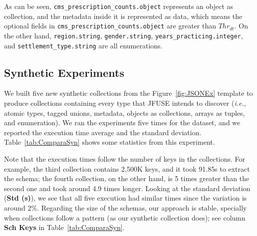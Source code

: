 As can be seen, \texttt{cms\_prescription\_counts.object} represents an object as collection, and the metadata inside it is represented as data, which means the optional fields in \texttt{cms\_prescription\_counts.object} are greater than $Thr_{dt}$.  
On the other hand, \texttt{region.string}, \texttt{gender.string}, \texttt{years\_practicing.integer}, and \texttt{settlement\_type.string} are all enumerations.

\subsection{Synthetic Experiments}
We built five new synthetic collections from the Figure~\ref{fig:JSONEx} template to produce collections containing every type that JFUSE intends to discover (\textit{i.e.}, atomic types, tagged unions, metadata, objects as collections, arrays as tuples, and enumeration). 
We ran the experiments five times for the dataset, and we reported the execution time average and the standard deviation. 
Table~\ref{tab:ComparaSyn} shows some statistics from this experiment. %

Note that the execution times follow the number of keys in the collections. 
For example, the third collection contains 2,500K keys, and it took 91.85s to extract the schema; the fourth collection, on the other hand, is 5 times greater than the second one and  took around 4.9 times longer. 
Looking at the standard deviation (\textbf{Std (s)}), we see that all five execution had similar times since the variation is around 2\%. 
Regarding the size of the schemas, our approach is stable, specially when collections follow a pattern (as our synthetic collection does); see column \textbf{Sch Keys} in Table~\ref{tab:ComparaSyn}. 


